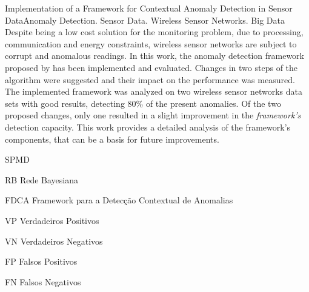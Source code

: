 \documentclass[cic,tc]{iiufrgs}
\begin{document}
\begin{abstract}
	Apesar de serem uma solução de monitoramento barata, devido a restrições de processamento, comunicação e energia, redes de sensores estão sujeitas a leituras corrompidas e anômalas. Neste trabalho, o \textit{framework} para a detecção de anomalias proposto por \cite{MasterMichaels2014} foi implementado e avaliado. Foram propostas mudanças em duas etapas do algoritmo e mediu-se o seu impacto no desempenho. O \textit{framework} implementado foi avaliado em dois conjuntos de dados de redes de sensores sem fio com resultados satisfatórios, detectando 80\% das anomalias presentes. Das duas mudanças propostas, apenas uma resultou em uma leve melhoria da capacidade de detecção do \textit{framework}. Este trabalho fornece uma análise detalhada dos componentes do \textit{framework}, o que pode ser tomado como base para futuras melhorias.
\end{abstract}

\begin{englishabstract}{
Implementation of a Framework for Contextual Anomaly Detection in Sensor Data}{Anomaly Detection.  Sensor Data. Wireless Sensor Networks. Big Data}
	Despite being a low cost solution for the monitoring problem, due to processing, communication and energy constraints, wireless sensor networks are subject to corrupt and anomalous readings. In this work, the anomaly detection framework proposed by \cite{MasterMichaels2014} has been implemented and evaluated. Changes in two steps of the algorithm were suggested and their impact on the performance was measured. The implemented framework was analyzed on two wireless sensor networks data sets with good results, detecting 80\% of the present anomalies. Of the two proposed changes, only one resulted in a slight improvement in the \textit{framework's} detection capacity. This work provides a detailed analysis of the framework's components, that can be a basis for future improvements.
\end{englishabstract}

\listoffigures

\listoftables

\begin{listofabbrv}{SPMD}
    \item[RB] Rede Bayesiana
    \item[FDCA] Framework para a Detecção Contextual de Anomalias
    \item[VP] Verdadeiros Positivos
    \item[VN] Verdadeiros Negativos
    \item[FP] Falsos Positivos
    \item[FN] Falsos Negativos
\end{listofabbrv}
\end{document}
